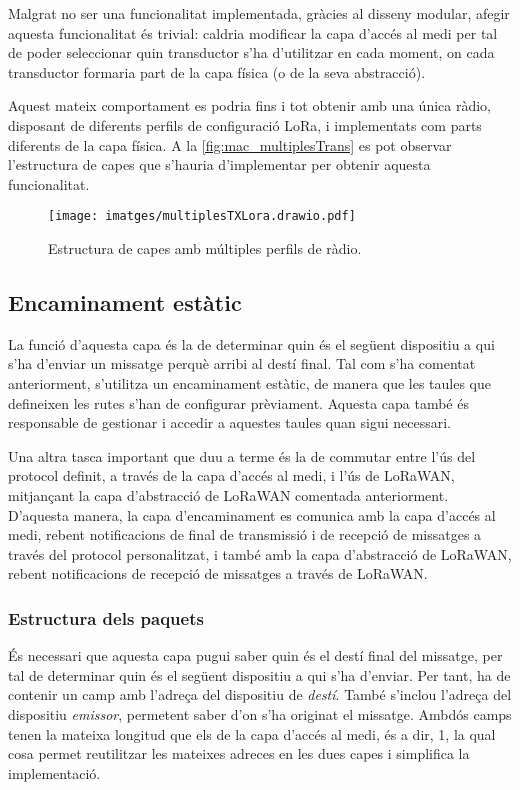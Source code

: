 \documentclass{tfgitic}[2024/07/01]
\begin{document}
{Malgrat no ser una funcionalitat implementada, gràcies al disseny modular, afegir aquesta funcionalitat és trivial: caldria modificar la capa d'accés al medi per tal de poder seleccionar quin transductor s'ha d'utilitzar en cada moment, on cada transductor formaria part de la capa física (o de la seva abstracció).

Aquest mateix comportament es podria fins i tot obtenir amb una única ràdio, disposant de diferents perfils de configuració LoRa, i implementats com parts diferents de la capa física. A la \autoref{fig:mac_multiplesTrans} es pot observar l'estructura de capes que s'hauria d'implementar per obtenir aquesta funcionalitat.

\begin{figure}
    \centering
        \texttt{[image: imatges/multiplesTXLora.drawio.pdf]}
    \caption{Estructura de capes amb múltiples perfils de ràdio.}
    \label{fig:mac_multiplesTrans}
\end{figure}


\subsection{Encaminament estàtic}
La funció d'aquesta capa és la de determinar quin és el següent dispositiu a qui s'ha d'enviar un missatge perquè arribi al destí final. Tal com s'ha comentat anteriorment, s'utilitza un encaminament estàtic, de manera que les taules que defineixen les rutes s'han de configurar prèviament. Aquesta capa també és responsable de gestionar i accedir a aquestes taules quan sigui necessari.

Una altra tasca important que duu a terme és la de commutar entre l'ús del protocol definit, a través de la capa d'accés al medi, i l'ús de LoRaWAN, mitjançant la capa d'abstracció de LoRaWAN comentada anteriorment. D'aquesta manera, la capa d'encaminament es comunica amb la capa d'accés al medi, rebent notificacions de final de transmissió i de recepció de missatges a través del protocol personalitzat, i també amb la capa d'abstracció de LoRaWAN, rebent notificacions de recepció de missatges a través de LoRaWAN.

\subsubsection{Estructura dels paquets}
És necessari que aquesta capa pugui saber quin és el destí final del missatge, per tal de determinar quin és el següent dispositiu a qui s'ha d'enviar. Per tant, ha de contenir un camp amb l'adreça del dispositiu de \emph{destí}. També s'inclou l'adreça del dispositiu \emph{emissor}, permetent saber d'on s'ha originat el missatge. Ambdós camps tenen la mateixa longitud que els de la capa d'accés al medi, és a dir, \SI{1}{\byte}, la qual cosa permet reutilitzar les mateixes adreces en les dues capes i simplifica la implementació.

}
\end{document}

